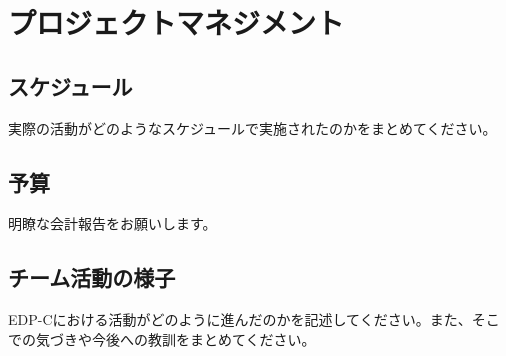 \section{プロジェクトマネジメント}

\subsection{スケジュール}
実際の活動がどのようなスケジュールで実施されたのかをまとめてください。

\subsection{予算}
明瞭な会計報告をお願いします。

\subsection{チーム活動の様子}
EDP-Cにおける活動がどのように進んだのかを記述してください。また、そこでの気づきや今後への教訓をまとめてください。
